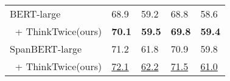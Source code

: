 \begin{table}[htbp]
\begin{tabular}{lp{24pt}<{\centering}p{24pt}<{\centering}p{24pt}<{\centering}p{24pt}<{\centering}}
         \hline
         BERT-large & 68.9 & 59.2 & 68.8 & 58.6 \\
         $\ $ + ThinkTwice(ours) & {\bfseries 70.1} & {\bfseries 59.5} & {\bfseries 69.8} & {\bfseries 59.4} \\
         \hline
         SpanBERT-large & 71.2 & 61.8 & 70.9 & 59.8 \\
         $\ $ + ThinkTwice(ours) & \underline{72.1} & \underline{62.2} & \underline{71.5} & \underline{61.0} \\
         \hline
    \end{tabular}
    \label{tab:3-1}
\end{table}
